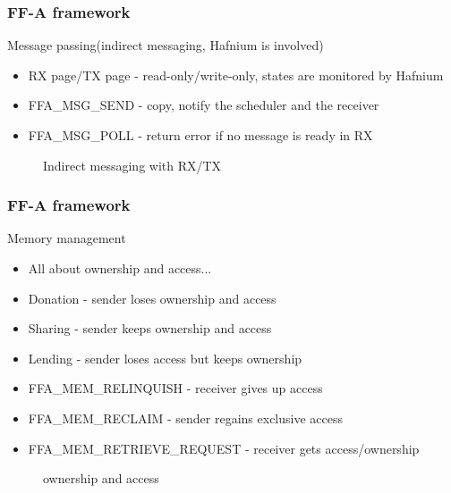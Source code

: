 \documentclass{beamer}
\begin{document}
\begin{frame}
  \frametitle{FF-A framework}
  Message passing(indirect messaging, Hafnium is involved)
  \begin{itemize}
    \item RX page/TX page - read-only/write-only, states are monitored by Hafnium
    \item FFA\_MSG\_SEND - copy, notify the scheduler and the receiver
    \item FFA\_MSG\_POLL - return error if no message is ready in RX
  \end{itemize}
  \begin{figure}
    
        \caption{Indirect messaging with RX/TX}
      \end{figure}
\end{frame}

\begin{frame}
  \frametitle{FF-A framework}
  Memory management
  \begin{itemize}
    \item All about ownership and access...
    \item Donation - sender loses ownership and access
    \item Sharing - sender keeps ownership and access
    \item Lending - sender loses access but keeps ownership
    \item FFA\_MEM\_RELINQUISH - receiver gives up access
    \item FFA\_MEM\_RECLAIM - sender regains exclusive access
    \item FFA\_MEM\_RETRIEVE\_REQUEST - receiver gets access/ownership
  \end{itemize}
  \begin{figure}
    
        \caption{ownership and access}
      \end{figure}
    \end{frame}
\end{document}
